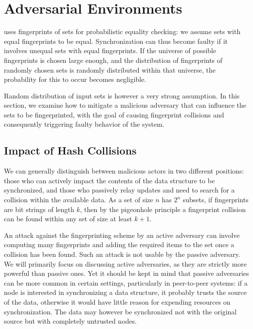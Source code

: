 \documentclass[conference]{IEEEtran}
\begin{document}

\section{Adversarial Environments}\label{secure}

 uses fingerprints of sets for probabilistic equality checking: we assume sets with equal fingerprints to be equal. Synchronization can thus become faulty if it involves unequal sets with equal fingerprints. If the universe of possible fingerprints is chosen large enough, and the distribution of fingerprints of randomly chosen sets is randomly distributed within that universe, the probability for this to occur becomes negligible.

Random distribution of input sets is however a very strong assumption. In this section, we examine how to mitigate a malicious adversary that can influence the sets to be fingerprinted, with the goal of causing fingerprint collisions and consequently triggering faulty behavior of the system.

\subsection{Impact of Hash Collisions}

We can generally distinguish between malicious actors in two different positions: those who can actively impact the contents of the data structure to be synchronized, and those who passively relay updates and need to search for a collision within the available data. As a set of size $n$ has $2^n$ subsets, if fingerprints are bit strings of length $k$, then by the pigeonhole principle a fingerprint collision can be found within any set of size at least $k + 1$.

An attack against the fingerprinting scheme by an active adversary can involve computing many fingerprints and adding the required items to the set once a collision has been found. Such an attack is not usable by the passive adversary. We will primarily focus on discussing active adversaries, as they are strictly more powerful than passive ones. Yet it should be kept in mind that passive adversaries can be more common in certain settings, particularly in peer-to-peer systems: if a node is interested in synchronizing a data structure, it probably trusts the source of the data, otherwise it would have little reason for expending resources on synchronization. The data may however be synchronized not with the original source but with completely untrusted nodes.
\end{document}
